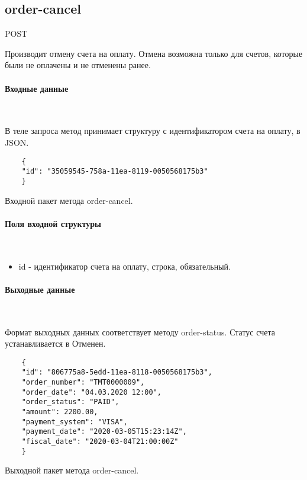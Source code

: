 \documentclass[11pt, a4paper]{article}
\begin{document}
\subsection{order-cancel}
POST

Производит отмену счета на оплату. Отмена возможна только для счетов, которые были не оплачены и не отменены ранее.

\paragraph{Входные данные}\

В теле запроса метод принимает структуру с идентификатором счета на оплату, в JSON.

\begin{listing}[H]
	\begin{verbatim}
	{
	"id": "35059545-758a-11ea-8119-0050568175b3"
	}
	\end{verbatim}
	\caption{Входной пакет метода order-cancel.} 
\end{listing}

\paragraph{Поля входной структуры}\

\begin{itemize}
	\item id - идентификатор счета на оплату, строка, обязательный.
\end{itemize}

\paragraph{Выходные данные}\

Формат выходных данных соответствует методу order-status. Статус счета устанавливается в Отменен.

\begin{listing}[H]
	\begin{verbatim}
	{
	"id": "806775a8-5edd-11ea-8118-0050568175b3",
	"order_number": "ТМТ0000009",
	"order_date": "04.03.2020 12:00",
	"order_status": "PAID",
	"amount": 2200.00,
	"payment_system": "VISA",
	"payment_date": "2020-03-05T15:23:14Z",
	"fiscal_date": "2020-03-04T21:00:00Z"
	}
	\end{verbatim}
	\caption{Выходной пакет метода order-cancel.} 
\end{listing}
\end{document}
